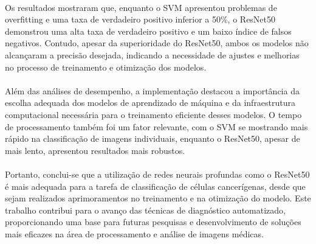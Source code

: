 \documentclass[12pt]{article}
\begin{document}
\paragraph{}Os resultados mostraram que, enquanto o SVM apresentou problemas de overfitting e uma taxa de verdadeiro positivo inferior a 50\%, o ResNet50 demonstrou uma alta taxa de verdadeiro positivo e um baixo índice de falsos negativos. Contudo, apesar da superioridade do ResNet50, ambos os modelos não alcançaram a precisão desejada, indicando a necessidade de ajustes e melhorias no processo de treinamento e otimização dos modelos.

\paragraph{}Além das análises de desempenho, a implementação destacou a importância da escolha adequada dos modelos de aprendizado de máquina e da infraestrutura computacional necessária para o treinamento eficiente desses modelos. O tempo de processamento também foi um fator relevante, com o SVM se mostrando mais rápido na classificação de imagens individuais, enquanto o ResNet50, apesar de mais lento, apresentou resultados mais robustos.

\paragraph{}Portanto, conclui-se que a utilização de redes neurais profundas como o ResNet50 é mais adequada para a tarefa de classificação de células cancerígenas, desde que sejam realizados aprimoramentos no treinamento e na otimização do modelo. Este trabalho contribui para o avanço das técnicas de diagnóstico automatizado, proporcionando uma base para futuras pesquisas e desenvolvimento de soluções mais eficazes na área de processamento e análise de imagens médicas.

\paragraph{}

\nocite{cancerCervical}
\nocite{coloracaoPapanicolau}
\nocite{papanicolauStain}
\nocite{resnet}
\nocite{svm}



\end{document}
